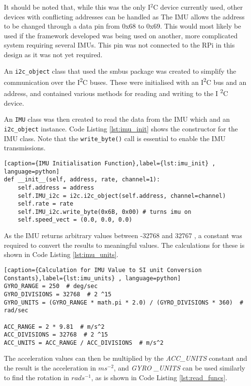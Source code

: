 It should be noted that, while this was the only I$^2$C device currently 
used, other devices with conflicting addresses can be handled as The IMU 
allows the address to be changed through a data pin from 0x68 to 0x69. 
This would most likely be used if the framework developed was being used 
on another, more complicated system requiring several IMUs. This pin was 
not connected to the RPi in this design as it was not yet required.

An \verb|i2c_object| class that used the smbus package was created to 
simplify the communication over the I\textsuperscript{2}C buses. These 
were initialised with an I\textsuperscript{2}C bus and an address, and 
contained various methods for reading and writing to the I
\textsuperscript{2}C device.


An \verb|IMU| class was then created to read the data from the IMU which 
and an \verb|i2c_object| instance. Code Listing \ref{lst:imu_init} shows 
the constructor for the IMU class. Note that the \verb|write_byte()| call 
is essential to enable the IMU transmissions.

\begin{lstlisting}[caption={IMU Initialisation Function},label={lst:imu_init} , language=python]
def __init__(self, address, rate, channel=1):
    self.address = address
    self.IMU_i2c = i2c.i2c_object(self.address, channel=channel)
    self.rate = rate
    self.IMU_i2c.write_byte(0x6B, 0x00) # turns imu on
    self.speed_vect = (0.0, 0.0, 0.0)
\end{lstlisting}

As the IMU returns arbitrary values between -32768 and 32767 
, a constant was required to convert the results to 
meaningful values. The calculations for these is shown in Code Listing 
\ref{lst:imu_units}.

\begin{lstlisting}[caption={Calculation for IMU Value to SI unit Conversion Constants},label={lst:imu_units} , language=python]
GYRO_RANGE = 250  # deg/sec
GYRO_DIVISIONS = 32768  # 2 ^15
GYRO_UNITS = (GYRO_RANGE * math.pi * 2.0) / (GYRO_DIVISIONS * 360)  # rad/sec

ACC_RANGE = 2 * 9.81  # m/s^2
ACC_DIVISIONS = 32768  # 2 ^15
ACC_UNITS = ACC_RANGE / ACC_DIVISIONS  # m/s^2
\end{lstlisting}

The acceleration values can then be multiplied by the \textit{ACC\_UNITS} 
constant and the result is the acceleration in $ms^{-2}$, and \textit{GYRO
\_UNITS} can be used similarly to find the rotation in $rads^{-1}$, as is 
shown in Code Listing \ref{lst:read_funcs}.


